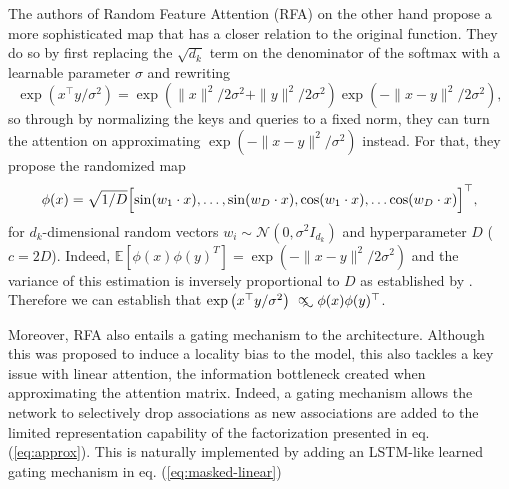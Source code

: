 \vspace{1em}

 The authors of Random Feature Attention (RFA) \cite{peng2021random} on the other hand propose a more sophisticated map that has a closer relation to the original function.  They do so by first replacing the $\sqrt{d_k}$ term on the denominator of the softmax with a learnable parameter $\sigma$ and rewriting 
 \begin{equation}
 \label{eq:exp-rewrite}
     \exp\left(x^\top y / \sigma^2 \right) = \exp\left(\|x\|^2/2\sigma^2 + \|y\|^2/2\sigma^2\right) \exp\left(-\|x - y\|^2/2\sigma^2\right),
 \end{equation}
 so through by normalizing the keys and queries to a fixed norm, they can turn the attention on approximating $\exp\left(-\|x - y\|^2/\sigma^2\right)$ instead. For that, they propose the randomized map
\begin{equation}
\label{eq:rfa}
\phi(x) = \sqrt{1/D} \Bigl[ \sin(w_1 \cdot x), \ldots, \sin(w_D \cdot x), \cos(w_1 \cdot x), \ldots \cos(w_D \cdot x) \Bigr]^\top,
\end{equation}
for $d_k$-dimensional random vectors $w_i \sim \mathcal{N}(0, \sigma^2 I_{d_k}) $ and hyperparameter $D$ ($c = 2D$). Indeed, $\mathbb{E}[\phi(x) \phi(y)^T] = \exp(- \| x - y \|^2 / 2\sigma^2)$ and the variance of this estimation is inversely proportional to $D$ as established by \cite{yu2016orthogonal}. Therefore we can establish that $\exp\left(x^\top y / \sigma^2\right) \approxprop \phi(x)\phi(y)^\top$.

Moreover, RFA also entails a gating mechanism to the architecture. Although this was proposed to induce a locality bias to the model, this also tackles a key issue with linear attention, the information bottleneck created when approximating the attention matrix. Indeed, a gating mechanism allows the network to selectively drop associations as new associations are added to the limited representation capability of the factorization presented in eq. (\ref{eq:approx}). This is naturally implemented by adding an LSTM-like \cite{10.1162/neco.1997.9.8.1735} learned gating mechanism in eq. (\ref{eq:masked-linear})

\vspace{1em}

